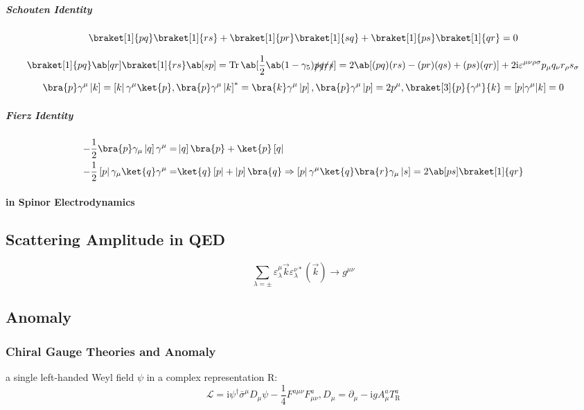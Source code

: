 \documentclass{article}
\newcommand{\calL}{\mathcal{L}}
\newcommand{\gammafive}{\gamma_5}
\newcommand{\gammamu}{\gamma^{\mu}}
\newcommand{\gmunu}{g^{\mu\nu}}
\newcommand{\rmi}{\mathrm{i}}
\newcommand{\rmR}{\mathrm{R}}
\newcommand{\slashedp}{\slashed{p}}
\newcommand{\slashedq}{\slashed{q}}
\newcommand{\slashedr}{\slashed{r}}
\newcommand{\slasheds}{\slashed{s}}
\newcommand{\veck}{\vec{k}}
\begin{document}
\subparagraph{Schouten Identity}

\[ \braket[1]{p q} \braket[1]{r s} + \braket[1]{p r} \braket[1]{s q} + \braket[1]{p s} \braket[1]{q r} = 0 \]

\[ \braket[1]{p q} \ab[q r] \braket[1]{r s} \ab[s p] = \Tr \ab[\frac{1}{2} \ab(1 - \gammafive) \slashedp \slashedq \slashedr \slasheds] = 2 \ab[(pq) (rs) - (p r)(q s) + (p s)(q r)] + 2 \rmi \varepsilon^{\mu\nu\rho\sigma} p_\mu q_\nu r_\rho s_\sigma \]
\[ \bra{p}\gammamu\left|k\right] = \left[k\right|\gammamu\ket{p}, \bra{p}\gammamu\left|k\right]^* = \bra{k}\gammamu\left|p\right], \bra{p}\gammamu\left|p\right] = 2 p^{\mu}, \braket[3]{p}{\gammamu}{k} = [p|\gammamu|k] = 0 \]

\subparagraph{Fierz Identity}

\begin{align*}
    - \frac{1}{2} \bra{p}\gamma_{\mu}\left|q\right] \gammamu = & \left|q\right] \bra{p} + \ket{p} \left[q\right|                                                                                                          \\
    - \frac{1}{2} \left[p\right|\gamma_{\mu}\ket{q} \gammamu = & \ket{q} \left[p\right| + \left|p\right] \bra{q} \Rightarrow \left[p\right|\gammamu\ket{q} \bra{r}\gamma_{\mu}\left|s\right] = 2 \ab[p s] \braket[1]{q r}
\end{align*}

\paragraph{in Spinor Electrodynamics}

\subsection{Scattering Amplitude in QED}

\[ \sum_{\lambda = \pm} \varepsilon_{\lambda}^{\mu}{\veck} \varepsilon_{\lambda}^{\nu *}(\veck) \to \gmunu \]

\subsection{Anomaly}

\subsubsection{Chiral Gauge Theories and Anomaly}

a single left-handed Weyl field $\psi$ in a complex representation $\rmR$:
\[ \calL = \rmi \psi^{\dagger} \bar{\sigma}^{\mu} D_{\mu} \psi - \frac{1}{4} F^{a\mu\nu} F^a_{\mu\nu}, D_{\mu} = \partial_{\mu} - \rmi g A^a_{\mu} T^a_\rmR \]
\end{document}
